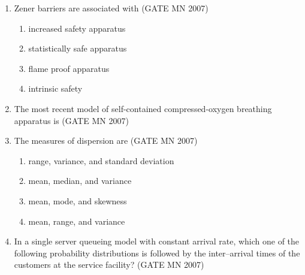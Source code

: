 \documentclass[journal]{IEEEtran}
\begin{document}
\begin{enumerate}
\item Zener barriers are associated with
	\hfill (GATE MN 2007)
\begin{enumerate}
		
    \item increased safety apparatus
    \item statistically safe apparatus
    \item flame proof apparatus
    \item intrinsic safety
	    
\end{enumerate}


\item The most recent model of self-contained compressed-oxygen breathing apparatus is
	\hfill (GATE MN 2007)
\begin{enumerate}
\end{enumerate}



\item The measures of dispersion are
\hfill (GATE MN 2007)
\begin{enumerate}
    \item range, variance, and standard deviation
    \item mean, median, and variance
    \item mean, mode, and skewness
    \item mean, range, and variance

\end{enumerate}


\item In a single server queueing model with constant arrival rate, which one of the following probability distributions is followed by the inter–arrival times of the customers at the service facility?
	\hfill (GATE MN 2007)
\begin{enumerate}
\end{enumerate}




\end{enumerate}
\end{document}
